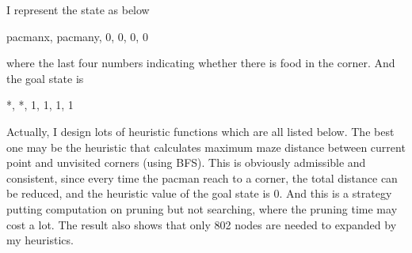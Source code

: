 \documentclass[a4paper, 11pt]{article}
\begin{document}
I represent the state as below
\begin{center}
  pacmanx, pacmany, 0, 0, 0, 0
\end{center}
where the last four numbers indicating whether there is food in the corner.
And the goal state is
\begin{center}
  *, *, 1, 1, 1, 1
\end{center}

Actually, I design lots of heuristic functions which are all listed below.
The best one may be the heuristic that calculates maximum maze distance between current point and unvisited corners (using BFS).
This is obviously admissible and consistent, since every time the pacman reach to a corner, the total distance can be reduced, and the heuristic value of the goal state is 0.
And this is a strategy putting computation on pruning but not searching, where the pruning time may cost a lot.
The result also shows that only 802 nodes are needed to expanded by my heuristics.
\end{document}
